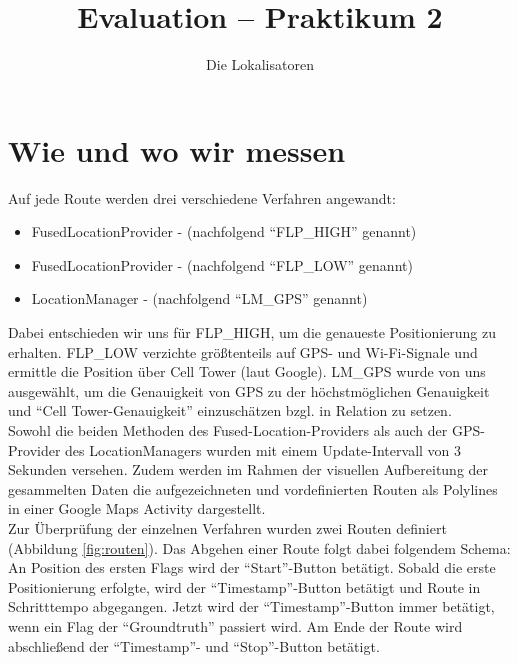 

\title{Evaluation -- Praktikum 2}
\author{Die Lokalisatoren}

\ihead{}
\chead{}
\ohead{}
\ifoot{}
\cfoot{\pagemark}
\ofoot{}



\setlength{\parskip}{0em}
\setlength{\parindent}{0em}
\renewcommand{\baselinestretch}{1.5}



\docheader

\section{Wie und wo wir messen}

Auf jede Route werden drei verschiedene Verfahren angewandt: 
\begin{itemize}
	\item FusedLocationProvider -  (nachfolgend "`FLP\_HIGH"' genannt)
	\item FusedLocationProvider -  (nachfolgend "`FLP\_LOW"' genannt)
	\item LocationManager -  (nachfolgend "`LM\_GPS"' genannt)
\end{itemize}

Dabei entschieden wir uns für FLP\_HIGH, um die genaueste Positionierung zu erhalten. FLP\_LOW verzichte größtenteils auf GPS- und Wi-Fi-Signale und ermittle die Position über Cell Tower (laut Google). LM\_GPS wurde von uns ausgewählt, um die Genauigkeit von GPS zu der höchstmöglichen Genauigkeit und "`Cell Tower-Genauigkeit"' einzuschätzen bzgl. in Relation zu setzen. \\Sowohl die beiden Methoden des Fused-Location-Providers als auch der GPS-Provider des LocationManagers wurden mit einem Update-Intervall von 3 Sekunden versehen. Zudem werden im Rahmen der visuellen Aufbereitung der gesammelten Daten die aufgezeichneten und vordefinierten Routen als Polylines in einer Google Maps Activity dargestellt.\\

Zur Überprüfung der einzelnen Verfahren wurden zwei Routen definiert (Abbildung \ref{fig:routen}). Das Abgehen einer Route folgt dabei folgendem Schema: An Position des ersten Flags wird der "`Start"'-Button betätigt. Sobald die erste Positionierung erfolgte, wird der "`Timestamp"'-Button betätigt und Route in Schritttempo abgegangen. Jetzt wird der "`Timestamp"'-Button immer betätigt, wenn ein Flag der "`Groundtruth"' passiert wird. Am Ende der Route wird abschließend der "`Timestamp"'- und "`Stop"'-Button betätigt.

